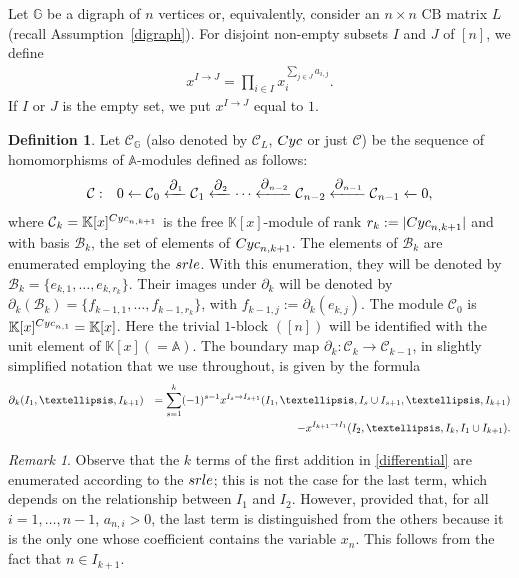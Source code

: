 \documentclass[10pt]{amsart}
\newcommand{\mbk}{\mbox{$\mathbb{K}$}}
\newcommand{\mba}{\mbox{$\mathbb{A}$}}
\newcommand{\mbg}{\mbox{$\mathbb{G}$}}
\newcommand{\mcb}{\mbox{$\mathcal{B}$}}
\newcommand{\mcc}{\mbox{$\mathcal{C}$}}
\newcommand{\cb}{\mbox{$\mathrm{CB}$}}
\newcommand{\dif}{\mbox{$\partial$}}
\newcommand{\sdif}{\mbox{\tiny $\partial$}}
\newcommand{\cyc}{\mbox{${\rm Cyc}$}}
\newcommand{\srle}{\mbox{${\rm srle}$}}
\theoremstyle{definition}
\newtheorem{definition}[cdrthm]{Definition}
\theoremstyle{remark}
\newtheorem{remark}[cdrthm]{Remark}
\begin{document}
 Let $\mbg$ be a digraph of $n$ vertices or, equivalently,
consider an $n\times n$ $\cb$ matrix $L$ (recall
Assumption~\ref{digraph}). For disjoint non-empty subsets $I$ and $J$
of $[n]$, we define
\begin{eqnarray*}
x^{I\to J}=\prod_{i\in I}x_{i}^{\sum_{j\in J}a_{i,j}}.
\end{eqnarray*}
If $I$ or $J$ is the empty set, we put $x^{I\to J}$ equal to $1$.

\begin{definition}\label{cyccomplex}
Let $\mcc_{\mathbb{G}}$ (also denoted by $\mcc_L$, $\cyc$ or just
$\mcc$) be the sequence of homomorphisms of $\mba$-modules defined as
follows:
\begin{eqnarray*}
\mcc &:& 0\leftarrow \mcc_0\xleftarrow{\sdif_1} \mcc_1
\xleftarrow{\sdif_2} \cdots \xleftarrow{\sdif_{n-2}} \mcc_{n-2}
\xleftarrow{\sdif_{n-1}}\mcc_{n-1}\xleftarrow{} 0,
\end{eqnarray*}
where $\mcc_k=\mbk[x]^{{\rm Cyc}_{n,k+1}}$ is the free
$\mbk[x]$-module of rank $r_k:=\lvert\cyc_{n,k+1}\rvert$ and with
basis $\mcb_{k}$, the set of elements of $\cyc_{n,k+1}$. The elements
of $\mcb_k$ are enumerated employing the $\srle$. With this
enumeration, they will be denoted by $\mcb_{k}=\{e_{k,1},\ldots
,e_{k,r_k}\}$. Their images under $\dif_k$ will be denoted by
$\dif_{k}(\mcb_{k})=\{f_{k-1,1},\ldots ,f_{k-1,r_k}\}$, with
$f_{k-1,j}:=\dif_k(e_{k,j})$. The module $\mcc_0$ is $\mbk[x]^{{\rm
    Cyc}_{n,1}}=\mbk[x]$. Here the trivial $1$-block $([n])$ will be
identified with the unit element of $\mbk[x](=\mba)$.  The boundary
map $\dif_{k}:\mcc_k\to\mcc_{k-1}$, in slightly simplified notation
that we use throughout, is given by the formula
\begin{eqnarray}\label{differential}
\dif_{k}(I_1,\ldots,I_{k+1}) & &= \sum_{s=1}^{k}(-1)^{s-1}x^{I_s\to
  I_{s+1}}(I_1,\ldots ,I_s\cup I_{s+1},\ldots ,I_{k+1}) \\ &&
-x^{I_{k+1}\to I_1}(I_2,\ldots,I_{k},I_1\cup I_{k+1}). \notag
\end{eqnarray}
\end{definition}

\begin{remark}\label{dif-and-enum}
Observe that the $k$ terms of the first addition in
\eqref{differential} are enumerated according to the $\srle$; this is
not the case for the last term, which depends on the relationship
between $I_1$ and $I_2$. However, provided that, for all $i=1,\ldots
,n-1$, $a_{n,i}> 0$, the last term is distinguished from the others
because it is the only one whose coefficient contains the variable
$x_n$. This follows from the fact that $n\in I_{k+1}$.
\end{remark}
\end{document}
